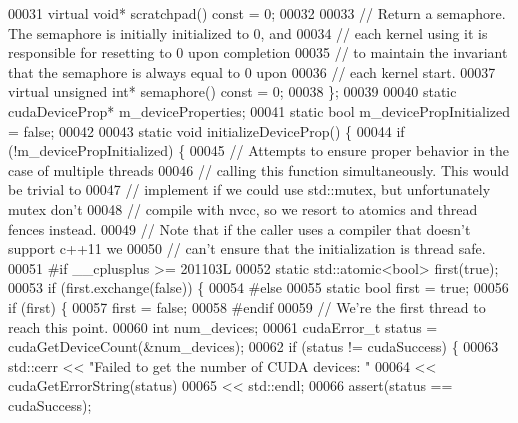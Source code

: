\begin{DoxyCode}
00031   \textcolor{keyword}{virtual} \textcolor{keywordtype}{void}* scratchpad() \textcolor{keyword}{const} = 0;
00032 
00033   \textcolor{comment}{// Return a semaphore. The semaphore is initially initialized to 0, and}
00034   \textcolor{comment}{// each kernel using it is responsible for resetting to 0 upon completion}
00035   \textcolor{comment}{// to maintain the invariant that the semaphore is always equal to 0 upon}
00036   \textcolor{comment}{// each kernel start.}
00037   \textcolor{keyword}{virtual} \textcolor{keywordtype}{unsigned} \textcolor{keywordtype}{int}* semaphore() \textcolor{keyword}{const} = 0;
00038 \};
00039 
00040 \textcolor{keyword}{static} cudaDeviceProp* m\_deviceProperties;
00041 \textcolor{keyword}{static} \textcolor{keywordtype}{bool} m\_devicePropInitialized = \textcolor{keyword}{false};
00042 
00043 \textcolor{keyword}{static} \textcolor{keywordtype}{void} initializeDeviceProp() \{
00044   \textcolor{keywordflow}{if} (!m\_devicePropInitialized) \{
00045     \textcolor{comment}{// Attempts to ensure proper behavior in the case of multiple threads}
00046     \textcolor{comment}{// calling this function simultaneously. This would be trivial to}
00047     \textcolor{comment}{// implement if we could use std::mutex, but unfortunately mutex don't}
00048     \textcolor{comment}{// compile with nvcc, so we resort to atomics and thread fences instead.}
00049     \textcolor{comment}{// Note that if the caller uses a compiler that doesn't support c++11 we}
00050     \textcolor{comment}{// can't ensure that the initialization is thread safe.}
00051 \textcolor{preprocessor}{#if \_\_cplusplus >= 201103L}
00052     \textcolor{keyword}{static} std::atomic<bool> first(\textcolor{keyword}{true});
00053     \textcolor{keywordflow}{if} (first.exchange(\textcolor{keyword}{false})) \{
00054 \textcolor{preprocessor}{#else}
00055     \textcolor{keyword}{static} \textcolor{keywordtype}{bool} first = \textcolor{keyword}{true};
00056     \textcolor{keywordflow}{if} (first) \{
00057       first = \textcolor{keyword}{false};
00058 \textcolor{preprocessor}{#endif}
00059       \textcolor{comment}{// We're the first thread to reach this point.}
00060       \textcolor{keywordtype}{int} num\_devices;
00061       cudaError\_t status = cudaGetDeviceCount(&num\_devices);
00062       \textcolor{keywordflow}{if} (status != cudaSuccess) \{
00063         std::cerr << \textcolor{stringliteral}{"Failed to get the number of CUDA devices: "}
00064                   << cudaGetErrorString(status)
00065                   << std::endl;
00066         assert(status == cudaSuccess);

\end{DoxyCode}
